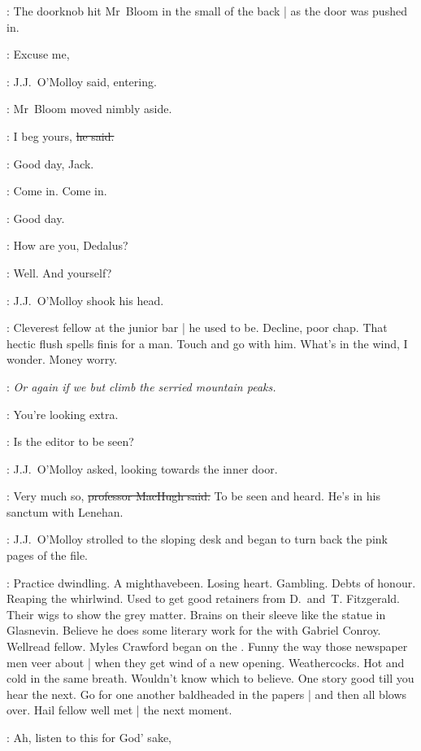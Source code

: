 :
The doorknob hit Mr~Bloom in the small of the back |
as the door was pushed in.

\jjom:
Excuse me,

:
J.J.~O'Molloy said,
entering.

:
Mr~Bloom moved nimbly aside.

\Bloom:
I beg yours,
\sout{he said.}

\lambert:
Good day,
Jack.

\simon:
Come in.
Come in.

\machugh:
Good day.

\jjom:
How are you, Dedalus?

\simon:
Well. And yourself?

:
J.J.~O'Molloy shook his head.



\BloomInt:
Cleverest fellow at the junior bar |
he used to be.
Decline, poor chap.
That hectic flush spells finis for a man.
Touch and go with him.
What's in the wind, I wonder.
Money worry.

\lambert:
\stage{[as Dawson]}
\emph{Or again if we but climb the serried mountain peaks.}

\simon:
You're looking extra.

\jjom:
Is the editor to be seen?

:
J.J.~O'Molloy asked,
looking towards the inner door.

\machugh:
Very much so,
\sout{professor MacHugh said.}
To be seen and heard.
He's in his sanctum
with Lenehan.

:
J.J.~O'Molloy strolled to the sloping desk
and began to turn back the pink pages of the file.

\BloomInt:
Practice dwindling.
A mighthavebeen.
Losing heart.
Gambling.
Debts of honour.
Reaping the whirlwind.
Used to get good retainers from D.~and~T. Fitzgerald.
Their wigs to show the grey matter.
Brains on their sleeve like the statue in Glasnevin.
Believe he does some literary work for the  with Gabriel Conroy.
Wellread fellow.
Myles Crawford began on the .
Funny the way those newspaper men veer about |
when they get wind of a new opening.
Weathercocks.
Hot and cold in the same breath.
Wouldn't know which to believe.
One story good till you hear the next.
Go for one another baldheaded in the papers |
and then all blows over.
Hail fellow well met |
the next moment.

\lambert:
Ah, listen to this for God' sake,

